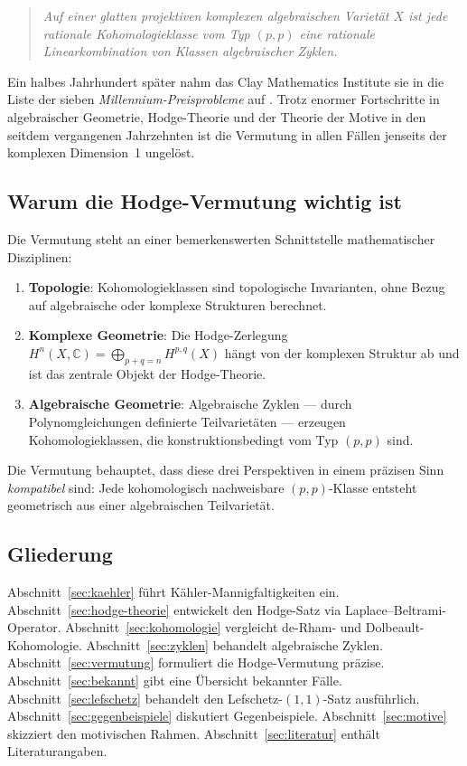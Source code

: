 \documentclass[12pt,a4paper]{amsart}
\theoremstyle{definition}
\theoremstyle{remark}
\begin{document}
\begin{quotation}
\itshape
Auf einer glatten projektiven komplexen algebraischen Varietät $X$ ist jede rationale
Kohomologieklasse vom Typ $(p,p)$ eine rationale Linearkombination von Klassen
algebraischer Zyklen.
\end{quotation}

Ein halbes Jahrhundert später nahm das Clay Mathematics Institute sie in die Liste
der sieben \emph{Millennium-Preisprobleme} auf \cite{clay2000}. Trotz enormer
Fortschritte in algebraischer Geometrie, Hodge-Theorie und der Theorie der Motive
in den seitdem vergangenen Jahrzehnten ist die Vermutung in allen Fällen jenseits
der komplexen Dimension~1 ungelöst.

\subsection*{Warum die Hodge-Vermutung wichtig ist}

Die Vermutung steht an einer bemerkenswerten Schnittstelle mathematischer Disziplinen:

\begin{enumerate}[label=(\roman*)]
\item \textbf{Topologie}: Kohomologieklassen sind topologische Invarianten, ohne
  Bezug auf algebraische oder komplexe Strukturen berechnet.
\item \textbf{Komplexe Geometrie}: Die Hodge-Zerlegung $H^n(X,\mathbb{C}) =
  \bigoplus_{p+q=n} H^{p,q}(X)$ hängt von der komplexen Struktur ab und ist das
  zentrale Objekt der Hodge-Theorie.
\item \textbf{Algebraische Geometrie}: Algebraische Zyklen — durch Polynomgleichungen
  definierte Teilvarietäten — erzeugen Kohomologieklassen, die konstruktionsbedingt
  vom Typ $(p,p)$ sind.
\end{enumerate}

Die Vermutung behauptet, dass diese drei Perspektiven in einem präzisen Sinn
\emph{kompatibel} sind: Jede kohomologisch nachweisbare $(p,p)$-Klasse entsteht
geometrisch aus einer algebraischen Teilvarietät.

\subsection*{Gliederung}

Abschnitt~\ref{sec:kaehler} führt Kähler-Mannigfaltigkeiten ein. Abschnitt~\ref{sec:hodge-theorie}
entwickelt den Hodge-Satz via Laplace–Beltrami-Operator. Abschnitt~\ref{sec:kohomologie}
vergleicht de-Rham- und Dolbeault-Kohomologie. Abschnitt~\ref{sec:zyklen} behandelt
algebraische Zyklen. Abschnitt~\ref{sec:vermutung} formuliert die Hodge-Vermutung
präzise. Abschnitt~\ref{sec:bekannt} gibt eine Übersicht bekannter Fälle.
Abschnitt~\ref{sec:lefschetz} behandelt den Lefschetz-$(1,1)$-Satz ausführlich.
Abschnitt~\ref{sec:gegenbeispiele} diskutiert Gegenbeispiele. Abschnitt~\ref{sec:motive}
skizziert den motivischen Rahmen. Abschnitt~\ref{sec:literatur} enthält Literaturangaben.
\end{document}
